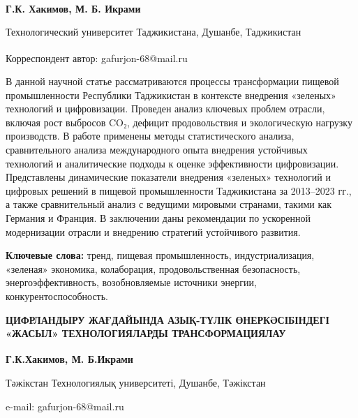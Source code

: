 
\begin{articleheader}

{\bfseries
Г.К. Хакимов\textsuperscript{\envelope },
М. Б. Икрами
}
\end{articleheader}

\begin{affiliation}
Технологический университет Таджикистана, Душанбе, Таджикистан

\raggedright \textsuperscript{\envelope }Корреспондент автор: gafurjon-68@mail.ru
\end{affiliation}

В данной научной статье рассматриваются процессы трансформации пищевой
промышленности Республики Таджикистан в контексте внедрения «зеленых»
технологий и цифровизации. Проведен анализ ключевых проблем отрасли,
включая рост выбросов CO₂, дефицит продовольствия и экологическую
нагрузку производств. В работе применены методы статистического анализа,
сравнительного анализа международного опыта внедрения устойчивых
технологий и аналитические подходы к оценке эффективности цифровизации.
Представлены динамические показатели внедрения «зеленых» технологий и
цифровых решений в пищевой промышленности Таджикистана за 2013--2023
гг., а также сравнительный анализ с ведущими мировыми странами, такими
как Германия и Франция. В заключении даны рекомендации по ускоренной
модернизации отрасли и внедрению стратегий устойчивого развития.

{\bfseries Ключевые слова:} тренд, пищевая промышленность,
индустриализация, «зеленая» экономика, колаборация, продовольственная
безопасность, энергоэффективность, возобновляемые источники энергии,
конкурентоспособность.

\begin{articleheader}
{\bfseries ЦИФРЛАНДЫРУ ЖАҒДАЙЫНДА АЗЫҚ-ТҮЛІК ӨНЕРКӘСІБІНДЕГІ «ЖАСЫЛ» ТЕХНОЛОГИЯЛАРДЫ ТРАНСФОРМАЦИЯЛАУ}

{\bfseries
Г.К.Хакимов\textsuperscript{\envelope },
М. Б.Икрами
}
\end{articleheader}

\begin{affiliation}
Тәжікстан Технологиялық университеті, Душанбе, Тәжікстан

e-mail: gafurjon-68@mail.ru
\end{affiliation}

